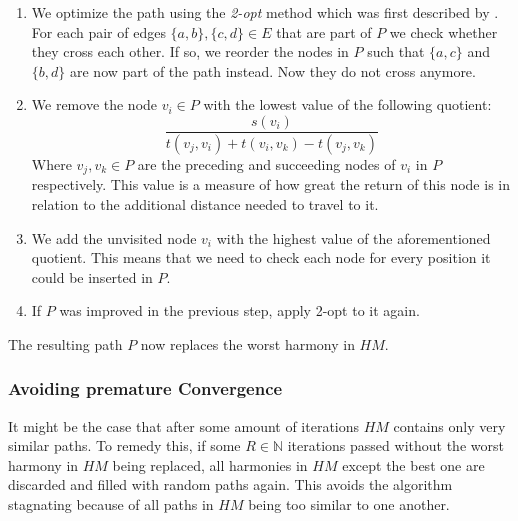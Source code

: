 \begin{enumerate}
  \item We optimize the path using the \emph{2-opt} method which was first described by \citeauthor{croes_method_1958}. \cite{croes_method_1958}
    For each pair of edges $\{a,b\}, \{c, d\} \in E$ that are part of $P$ we check whether they cross each other. 
    If so, we reorder the nodes in $P$ such that $\{a, c\}$ and $\{b, d\}$ are now part of the path instead. Now they do not cross anymore.
  \item We remove the node $v_i \in P$ with the lowest value of the following quotient:
    \begin{equation*}
      \frac{s(v_i)}{t(v_j, v_i) + t(v_i, v_k) - t(v_j, v_k)}
    \end{equation*}
    Where $v_j, v_k \in P$ are the preceding and succeeding nodes of $v_i$ in $P$ respectively.
    This value is a measure of how great the return of this node is in relation to the additional distance needed to travel to it.
  \item We add the unvisited node $v_i$ with the highest value of the aforementioned quotient. 
    This means that we need to check each node for every position it could be inserted in $P$.
  \item If $P$ was improved in the previous step, apply 2-opt to it again.
\end{enumerate}

The resulting path $P$ now replaces the worst harmony in $HM$.

\subsubsection{Avoiding premature Convergence}

It might be the case that after some amount of iterations $HM$ contains only very similar paths.
To remedy this, if some $R \in \mathbb{N}$ iterations passed without the worst harmony in $HM$ being replaced,
all harmonies in $HM$ except the best one are discarded and filled with random paths again.
This avoids the algorithm stagnating because of all paths in $HM$ being too similar to one another. 

